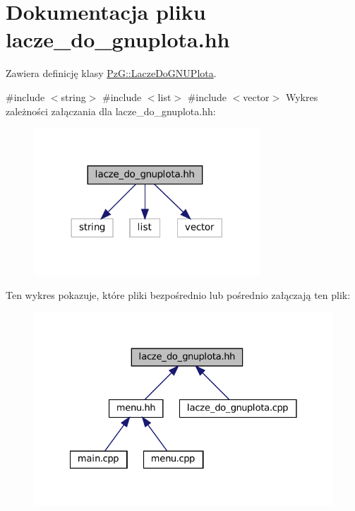 \hypertarget{lacze__do__gnuplota_8hh}{}\section{Dokumentacja pliku lacze\+\_\+do\+\_\+gnuplota.\+hh}
\label{lacze__do__gnuplota_8hh}


Zawiera definicję klasy \mbox{\hyperlink{class_pz_g_1_1_lacze_do_g_n_u_plota}{Pz\+G\+::\+Lacze\+Do\+G\+N\+U\+Plota}}.  


{\ttfamily \#include $<$string$>$}\newline
{\ttfamily \#include $<$list$>$}\newline
{\ttfamily \#include $<$vector$>$}\newline
Wykres zależności załączania dla lacze\+\_\+do\+\_\+gnuplota.\+hh\+:\nopagebreak
\begin{figure}[H]
\begin{center}
\leavevmode
\includegraphics[width=240pt]{lacze__do__gnuplota_8hh__incl}
\end{center}
\end{figure}
Ten wykres pokazuje, które pliki bezpośrednio lub pośrednio załączają ten plik\+:\nopagebreak
\begin{figure}[H]
\begin{center}
\leavevmode
\includegraphics[width=328pt]{lacze__do__gnuplota_8hh__dep__incl}
\end{center}
\end{figure}
